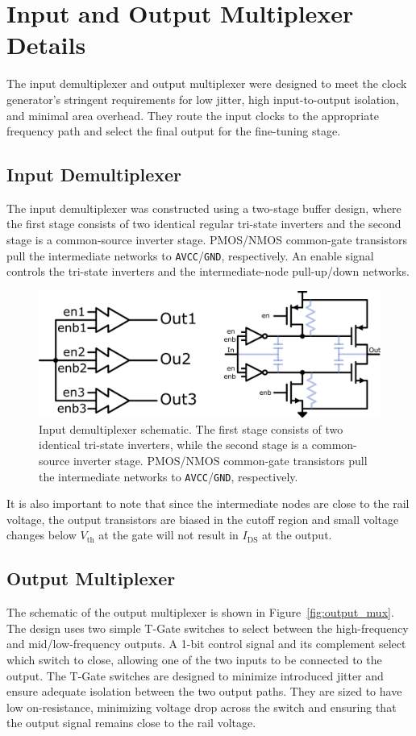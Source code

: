 \section{Input and Output Multiplexer Details}
\label{app:mux_details}

The input demultiplexer and output multiplexer were designed to meet the clock generator's stringent requirements for low jitter, high input-to-output isolation, and minimal area overhead. They route the input clocks to the appropriate frequency path and select the final output for the fine-tuning stage.

\subsection{Input Demultiplexer}
The input demultiplexer was constructed using a two-stage buffer design, where the first stage consists of two identical regular tri-state inverters and the second stage is a common-source inverter stage. PMOS/NMOS common-gate transistors pull the intermediate networks to \texttt{AVCC}/\texttt{GND}, respectively. An enable signal controls the tri-state inverters and the intermediate-node pull-up/down networks.

\begin{figure}[htbp]
  \centering
  \includegraphics[width=0.8\linewidth]{figures/Schematics/input_demux.png}
  \caption{Input demultiplexer schematic. The first stage consists of two identical tri-state inverters, while the second stage is a common-source inverter stage. PMOS/NMOS common-gate transistors pull the intermediate networks to \texttt{AVCC}/\texttt{GND}, respectively.}
  \label{fig:input_demux}
\end{figure}

It is also important to note that since the intermediate nodes are close to the rail voltage, the output transistors are biased in the cutoff region and small voltage changes below \(V_\text{th}\) at the gate will not result in \(I_\text{DS}\) at the output.

\subsection{Output Multiplexer}
The schematic of the output multiplexer is shown in Figure~\ref{fig:output_mux}. The design uses two simple T-Gate switches to select between the high-frequency and mid/low-frequency outputs. A 1-bit control signal and its complement select which switch to close, allowing one of the two inputs to be connected to the output. The T-Gate switches are designed to minimize introduced jitter and ensure adequate isolation between the two output paths. They are sized to have low on-resistance, minimizing voltage drop across the switch and ensuring that the output signal remains close to the rail voltage.

